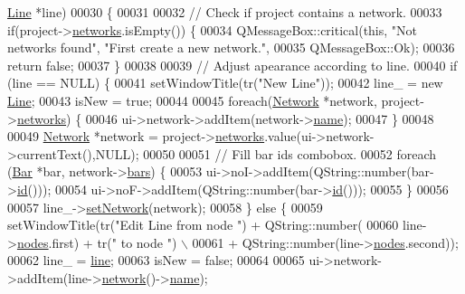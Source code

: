 \begin{DoxyCode}
      \hyperlink{class_line}{Line} *line)
00030 \{
00031 
00032   \textcolor{comment}{// Check if project contains a network.}
00033   \textcolor{keywordflow}{if}(project->\hyperlink{class_project_aa98126154cab59769a431668e6f17daf}{networks}.isEmpty()) \{
00034     QMessageBox::critical(\textcolor{keyword}{this}, \textcolor{stringliteral}{"Not networks found"}, \textcolor{stringliteral}{"First create a new network."},
00035                           QMessageBox::Ok);
00036     \textcolor{keywordflow}{return} \textcolor{keyword}{false};
00037   \}
00038 
00039   \textcolor{comment}{// Adjust apearance according to line.}
00040   \textcolor{keywordflow}{if} (line == NULL) \{
00041     setWindowTitle(tr(\textcolor{stringliteral}{"New Line"}));
00042     line\_ = \textcolor{keyword}{new} \hyperlink{class_line}{Line};
00043     isNew = \textcolor{keyword}{true};
00044 
00045     \textcolor{keywordflow}{foreach}(\hyperlink{class_network}{Network} *network, project->\hyperlink{class_project_aa98126154cab59769a431668e6f17daf}{networks}) \{
00046       ui->network->addItem(network->\hyperlink{class_network_ab6643733a517f930c60b06f5ffd78186}{name});
00047     \}
00048 
00049     \hyperlink{class_network}{Network} *network = project->\hyperlink{class_project_aa98126154cab59769a431668e6f17daf}{networks}.value(ui->network->currentText(),NULL);
00050 
00051     \textcolor{comment}{// Fill bar ids combobox.}
00052     \textcolor{keywordflow}{foreach} (\hyperlink{class_bar}{Bar} *bar, network->\hyperlink{class_network_ae37a8418e42adf765b143cdc9d992b6c}{bars}) \{
00053       ui->noI->addItem(QString::number(bar->\hyperlink{group___models_gacf0fb781a73856bb7beb823304465e13}{id}()));
00054       ui->noF->addItem(QString::number(bar->\hyperlink{group___models_gacf0fb781a73856bb7beb823304465e13}{id}()));
00055     \}
00056 
00057     line\_->\hyperlink{group___models_ga320766e09f0ea36b2dd07d3b1db1b72e}{setNetwork}(network);
00058   \} \textcolor{keywordflow}{else} \{
00059     setWindowTitle(tr(\textcolor{stringliteral}{"Edit Line from node "}) + QString::number(
00060                      line->\hyperlink{class_line_afd17c40d656e6a8d677cb22df5f0c70b}{nodes}.first) + tr(\textcolor{stringliteral}{" to node "}) \(\backslash\)
00061                    + QString::number(line->\hyperlink{class_line_afd17c40d656e6a8d677cb22df5f0c70b}{nodes}.second));
00062     line\_ = \hyperlink{class_line_properties_ae99691d680b4df7bac3419b5588bd777}{line};
00063     isNew = \textcolor{keyword}{false};
00064 
00065     ui->network->addItem(line->\hyperlink{group___models_gaa4cfa330c9c53ddaf86c8f5c17ba1ee0}{network}()->\hyperlink{class_network_ab6643733a517f930c60b06f5ffd78186}{name});

\end{DoxyCode}
